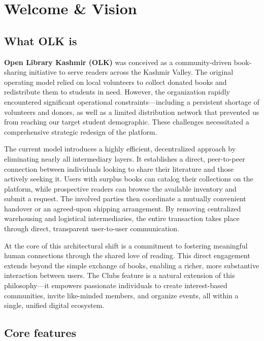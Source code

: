 \chapter{Welcome \& Vision}
\label{ch:welcome}

\section{What OLK is}

\textbf{Open Library Kashmir (OLK)} was conceived as a community-driven book-sharing initiative to serve readers across the Kashmir Valley. The original operating model relied on local volunteers to collect donated books and redistribute them to students in need. However, the organization rapidly encountered significant operational constraints—including a persistent shortage of volunteers and donors, as well as a limited distribution network that prevented us from reaching our target student demographic. These challenges necessitated a comprehensive strategic redesign of the platform.

The current model introduces a highly efficient, decentralized approach by eliminating nearly all intermediary layers. It establishes a direct, peer-to-peer connection between individuals looking to share their literature and those actively seeking it. Users with surplus books can catalog their collections on the platform, while prospective readers can browse the available inventory and submit a request. The involved parties then coordinate a mutually convenient handover or an agreed-upon shipping arrangement. By removing centralized warehousing and logistical intermediaries, the entire transaction takes place through direct, transparent user-to-user communication.

At the core of this architectural shift is a commitment to fostering meaningful human connections through the shared love of reading. This direct engagement extends beyond the simple exchange of books, enabling a richer, more substantive interaction between users. The Clubs feature is a natural extension of this philosophy—it empowers passionate individuals to create interest-based communities, invite like-minded members, and organize events, all within a single, unified digital ecosystem.

\section{Core features}

